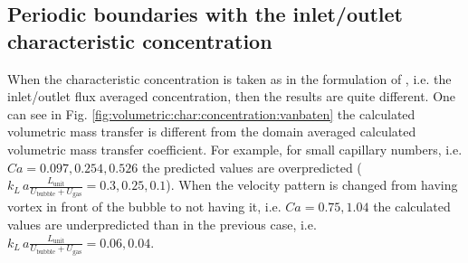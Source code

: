 \documentclass{article}
\newcommand{\vol}{k_L\,a}
\newcommand{\lunit}{L_{\mathrm{unit}}}
\newcommand{\ububble}{U_{\mathrm{bubble}}}
\newcommand{\ugas}{U_{\mathrm{gas}}}
\newcommand{\volnondim}{\vol \frac{\lunit}{\ububble+\ugas}}
\begin{document}
\subsection{Periodic boundaries with the inlet/outlet characteristic concentration}
\label{results:periodic:inlet:outlet}
When the characteristic concentration is taken as in the formulation of \citet{vanbaten-circular},
i.e. the inlet/outlet flux averaged concentration, then the results are quite different. One can
see in Fig. \ref{fig:volumetric:char:concentration:vanbaten} the calculated volumetric mass transfer
is different from the domain averaged calculated volumetric mass transfer coefficient. For example,
for small capillary numbers, i.e. $Ca=0.097,0.254,0.526$ the predicted values are overpredicted
($\volnondim=0.3,0.25,0.1$). When the velocity pattern is changed from having vortex in front of
the bubble to not having it,  i.e. $Ca=0.75,1.04$ the calculated values
are underpredicted than in the previous case, i.e. $\volnondim=0.06,0.04$.
\end{document}
